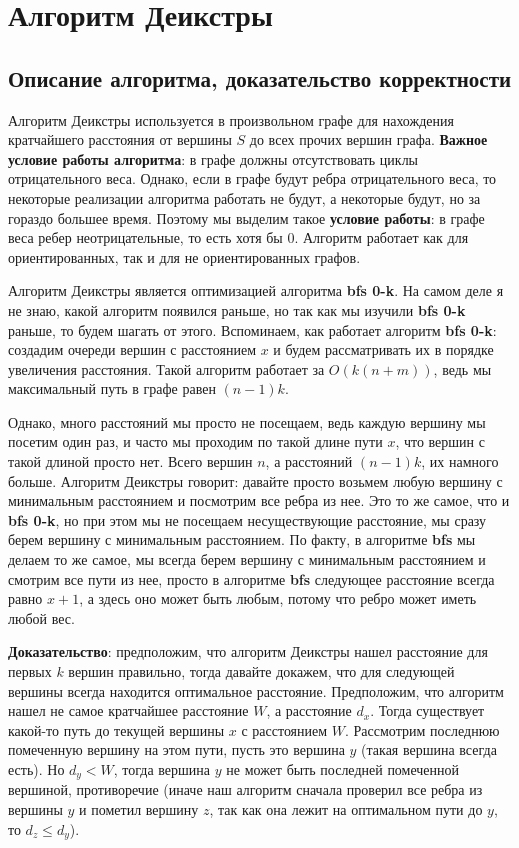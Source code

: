 \documentclass[../../main.tex]{subfiles}
\begin{document}
\section{Алгоритм Деикстры}

\subsection{Описание алгоритма, доказательство корректности}

Алгоритм Деикстры используется в произвольном графе для нахождения кратчайшего расстояния от вершины $S$ до всех прочих вершин графа. 
\textbf{Важное условие работы алгоритма}: в графе должны отсутствовать циклы отрицательного веса. 
Однако, если в графе будут ребра отрицательного веса, то некоторые реализации алгоритма работать не будут, а некоторые будут, но за гораздо большее время. 
Поэтому мы выделим такое \textbf{условие работы}: в графе веса ребер неотрицательные, то есть хотя бы $0$.
Алгоритм работает как для ориентированных, так и для не ориентированных графов.

Алгоритм Деикстры является оптимизацией алгоритма \textbf{bfs 0-k}. На самом деле я не знаю, какой алгоритм появился раньше, но так как мы изучили 
\textbf{bfs 0-k} раньше, то будем шагать от этого. Вспоминаем, как работает алгоритм \textbf{bfs 0-k}: создадим очереди вершин с расстоянием $x$ и будем
рассматривать их в порядке увеличения расстояния. Такой алгоритм работает за $O(k(n+m))$, ведь мы максимальный путь в графе равен $(n-1)k$. 

Однако, много расстояний мы просто не посещаем, ведь каждую вершину мы посетим один раз, и часто мы проходим по такой длине пути $x$, что вершин с такой длиной просто нет.
Всего вершин $n$, а расстояний $(n-1)k$, их намного больше. Алгоритм Деикстры говорит: давайте просто возьмем любую вершину с минимальным расстоянием и посмотрим все ребра из нее.
Это то же самое, что и \textbf{bfs 0-k}, но при этом мы не посещаем несуществующие расстояние, мы сразу берем вершину с минимальным расстоянием. 
По факту, в алгоритме \textbf{bfs} мы делаем то же самое, мы всегда берем вершину с минимальным расстоянием и смотрим все пути из нее, просто в алгоритме \textbf{bfs} следующее расстояние
всегда равно $x+1$, а здесь оно может быть любым, потому что ребро может иметь любой вес. 

\textbf{Доказательство}: предположим, что алгоритм Деикстры нашел расстояние для первых $k$ вершин правильно, тогда давайте докажем, что
для следующей вершины всегда находится оптимальное расстояние. Предположим, что алгоритм нашел не самое кратчайшее расстояние $W$, а расстояние $d_x$. 
Тогда существует какой-то путь до текущей вершины $x$ с расстоянием $W$. Рассмотрим последнюю помеченную вершину на этом пути, пусть это вершина $y$ (такая вершина всегда есть). 
Но $d_y < W$, тогда вершина $y$ не может быть последней помеченной вершиной, противоречие (иначе наш алгоритм сначала проверил все 
ребра из вершины $y$ и пометил вершину $z$, так как она лежит на оптимальном пути до $y$, то $d_z \leq d_y$). 
\end{document}
